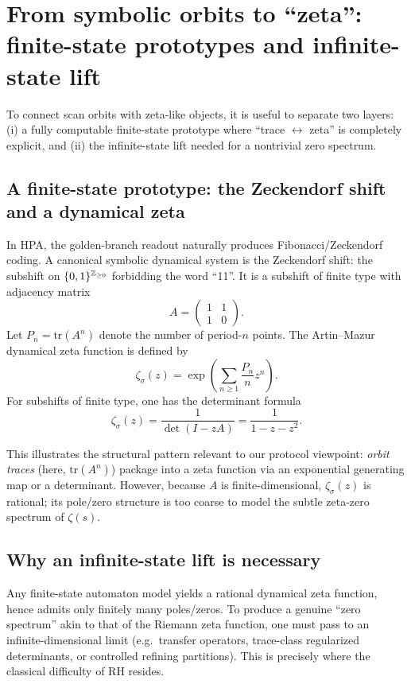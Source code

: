 
\section{From symbolic orbits to ``zeta'': finite-state prototypes and infinite-state lift}
\label{sec:orbits_to_zeta}

To connect scan orbits with zeta-like objects, it is useful to separate two layers:
(i) a fully computable finite-state prototype where ``trace $\leftrightarrow$ zeta'' is completely explicit, and
(ii) the infinite-state lift needed for a nontrivial zero spectrum.

\subsection{A finite-state prototype: the Zeckendorf shift and a dynamical zeta}
\label{sec:finite_state_zeta}

In HPA, the golden-branch readout naturally produces Fibonacci/Zeckendorf coding.
A canonical symbolic dynamical system is the Zeckendorf shift: the subshift on $\{0,1\}^{\mathbb{Z}_{\ge 0}}$ forbidding the word ``11''.
It is a subshift of finite type with adjacency matrix
\[
A=\begin{pmatrix}1&1\\[2pt]1&0\end{pmatrix}.
\]
Let $P_n=\mathrm{tr}(A^n)$ denote the number of period-$n$ points.
The Artin--Mazur dynamical zeta function is defined by \cite{ArtinMazur1965, Ruelle1976}
\[
\zeta_{\sigma}(z)=\exp\!\left(\sum_{n\ge 1}\frac{P_n}{n}z^n\right).
\]
For subshifts of finite type, one has the determinant formula
\[
\zeta_{\sigma}(z)=\frac{1}{\det(I-zA)}=\frac{1}{1-z-z^2}.
\]

This illustrates the structural pattern relevant to our protocol viewpoint:
\emph{orbit traces} (here, $\mathrm{tr}(A^n)$) package into a zeta function via an exponential generating map or a determinant.
However, because $A$ is finite-dimensional, $\zeta_{\sigma}(z)$ is rational; its pole/zero structure is too coarse to model the subtle zeta-zero spectrum of $\zeta(s)$.

\subsection{Why an infinite-state lift is necessary}
\label{sec:infinite_lift}

Any finite-state automaton model yields a rational dynamical zeta function, hence admits only finitely many poles/zeros.
To produce a genuine ``zero spectrum'' akin to that of the Riemann zeta function, one must pass to an infinite-dimensional limit (e.g.\ transfer operators, trace-class regularized determinants, or controlled refining partitions).
This is precisely where the classical difficulty of RH resides.


